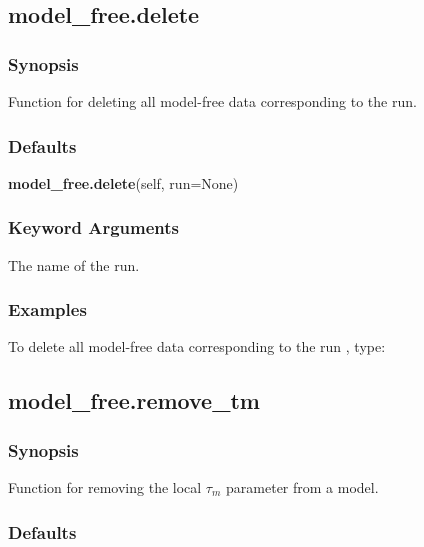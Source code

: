  \subsection{model\_free.delete} 

  
 \subsubsection{Synopsis} 

 Function for deleting all model-free data corresponding to the run. 
  

  
 \subsubsection{Defaults} 

 \textsf{\textbf{model\_free.delete}(self, run=None)} 

  
 \subsubsection{Keyword Arguments} 

   The name of the run.  

  

  
 \subsubsection{Examples} 

 To delete all model-free data corresponding to the run , type: 
  


  

 \newpage 

 \subsection{model\_free.remove\_tm} 

  
 \subsubsection{Synopsis} 

 Function for removing the local $\tau_m$ parameter from a model. 
  

  
 \subsubsection{Defaults} 

